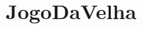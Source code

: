 \chapter{Jogo\+Da\+Velha}
\hypertarget{md_README}{}\label{md_README}
\label{md_README_autotoc_md0}%
%
